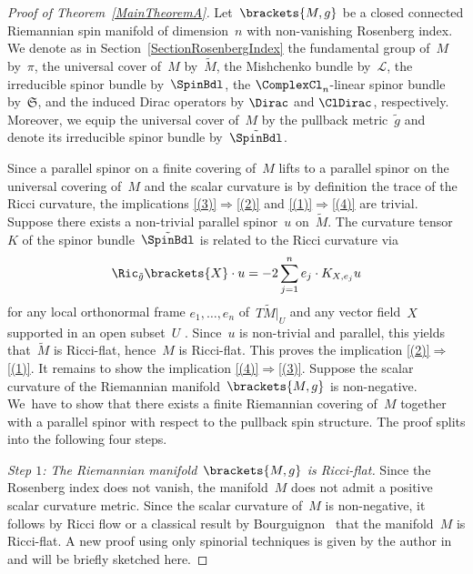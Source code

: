\documentclass[pdftex]{sigma}
\numberwithin{equation}{section}
\newcommand{\ClSpinBdl}{\mathfrak{S}}
\begin{document}
\begin{proof}[Proof of Theorem~\ref{MainTheoremA}]
Let~$\brackets{M,g}$ be a closed connected Riemannian spin manifold of dimension~$n$ with non-vanishing Rosenberg index. We denote as in Section~\ref{SectionRosenbergIndex} the fundamental group of~$M$ by~$\pi$, the universal cover of~$M$ by~$\tilde{M}$, the Mishchenko bundle by~$\mathcal{L}$, the irreducible spinor bundle by~$\SpinBdl$, the $\ComplexCl_n$-linear spinor bundle by~$\ClSpinBdl$, and the induced Dirac operators by $\Dirac$ and $\ClDirac$, respectively. Moreover, we equip the universal cover of~$M$ by the pullback metric~$\tilde{g}$ and denote its irreducible spinor bundle by~$\tilde{\SpinBdl}$.

Since a parallel spinor on a finite covering of~$M$ lifts to a parallel spinor on the universal covering of~$M$ and the scalar curvature is by definition the trace of the Ricci curvature, the implications \ref{(3)}$\Rightarrow$\ref{(2)} and \ref{(1)}$\Rightarrow$\ref{(4)} are trivial. Suppose there exists a non-trivial parallel spinor~$u$ on~$\tilde{M}$. The curvature tensor~$K$ of the spinor bundle~$\tilde{\SpinBdl}$ is related to the Ricci curvature via
%
\begin{equation} \label{RicCurvatureRealtion}
 \Ric_{\tilde{g}} \brackets{X} \cdot u = -2 \sum_{j=1}^n e_j\cdot K_{X,e_j}u
\end{equation}
%
for any local orthonormal frame $e_1,\dots,e_n$ of~$T\tilde{M}|_U$ and any vector field~$X$ supported in an open subset~$U$ \cite[Section 3.1]{Friedrich2000}. Since~$u$ is non-trivial and parallel, this yields that~$\tilde{M}$ is Ricci-flat, hence~$M$ is Ricci-flat. This proves the implication \ref{(2)}$\Rightarrow$\ref{(1)}. It remains to show the implication \ref{(4)}$\Rightarrow$\ref{(3)}. Suppose the scalar curvature of the Riemannian manifold~$\brackets{M,g}$ is non-negative. We~have to show that there exists a finite Riemannian covering of~$M$ together with a parallel spinor with respect to the pullback spin structure. The proof splits into the following four steps.

{\it Step $1$: The Riemannian manifold~$\brackets{M,g}$ is Ricci-flat.} %
Since the Rosenberg index does not vanish, the manifold~$M$ does not admit a positive scalar curvature metric. Since the scalar curvature of~$M$ is non-negative, it follows by Ricci flow or a classical result by Bourguignon~\cite{Kazdan1975a} that the manifold~$M$ is Ricci-flat. A new proof using only spinorial techniques is given by the author in \cite[Sections~3 and~4]{Tony2025} and will be briefly sketched here.


\end{proof}
\end{document}
